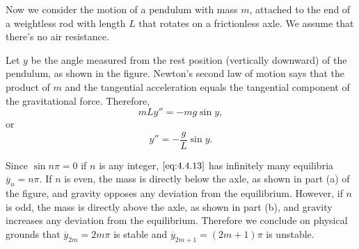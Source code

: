 \documentclass{ximera}
\begin{document}
\begin{example}\label{example:4.4.2}
Now we
consider the motion of a pendulum with mass $m$, attached to the end
of a weightless rod with length $L$ that rotates on a frictionless
axle. We assume that there's no air
resistance.

\begin{center}
\end{center}
 
 
 
Let $y$ be the angle measured from the rest position
(vertically downward) of the pendulum, as shown in
the figure. Newton's second law of motion says that the
product of $m$ and the tangential acceleration equals the tangential
component of the gravitational force.  Therefore,
$$
mLy''=-mg\sin y,
$$
or
\begin{equation}\label{eq:4.4.13}
y''=-\frac{g}{L}\sin y.
\end{equation}
 
 
Since $\sin n\pi=0$ if $n$ is any integer,  $\eqref{eq:4.4.13}$ has
infinitely many equilibria $\overline{y}_n=n\pi$. If $n$ is
even, the mass is directly below the axle, as shown in part (a) of the figure, and gravity opposes any deviation
from the equilibrium. However, if $n$ is odd, the mass is directly
above the axle, as shown in part (b), and gravity
increases any deviation from the equilibrium. Therefore we conclude
on physical grounds that $\overline{y}_{2m}=2m\pi$ is stable and
$\overline{y}_{2m+1}=(2m+1)\pi$ is unstable.

\begin{center}
\end{center} 
 

\end{example}
\end{document}
